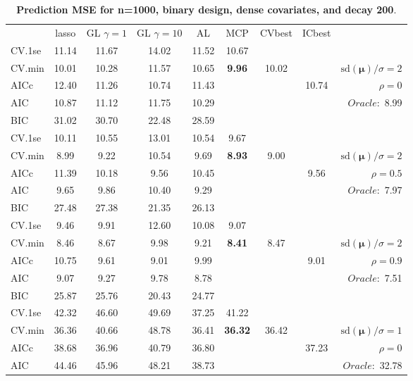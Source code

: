\clearpage
\begin{table}\vspace{-.5cm}
\caption[l]{ { \bf Prediction MSE for n=1000, binary design, 
dense covariates, and  decay  200}.}
\vspace{-.5cm}
\footnotesize{}
\begin{center}
\begin{tabular}{l*{7}{c}|r}
 & lasso & GL $\gamma=1$ & GL $\gamma=10$ & AL & MCP  & CVbest & ICbest  \\
\cline{1-9}
CV.1se & 11.14 & 11.67 & 14.02 & 11.52 & 10.67 & & & \\
CV.min & 10.01 & 10.28 & 11.57 & 10.65 & {\bf 9.96} & 10.02 & & $\mathrm{sd}(\mathbf{\mu})/\sigma=2$ \\
AICc & 12.40 & 11.26 & 10.74 & 11.43 & & & 10.74 &  $\rho=0$ \\
AIC & 10.87 & 11.12 & 11.75 & 10.29 & & & &  \multirow{2}{*}{$Oracle: $ 8.99} \\
BIC & 31.02 & 30.70 & 22.48 & 28.59 & & & &  \\
 \hline 
CV.1se & 10.11 & 10.55 & 13.01 & 10.54 & 9.67 & & & \\
CV.min & 8.99 & 9.22 & 10.54 & 9.69 & {\bf 8.93} & 9.00 & & $\mathrm{sd}(\mathbf{\mu})/\sigma=2$ \\
AICc & 11.39 & 10.18 & 9.56 & 10.45 & & & 9.56 &  $\rho=0.5$ \\
AIC & 9.65 & 9.86 & 10.40 & 9.29 & & & &  \multirow{2}{*}{$Oracle: $ 7.97} \\
BIC & 27.48 & 27.38 & 21.35 & 26.13 & & & &  \\
 \hline 
CV.1se & 9.46 & 9.91 & 12.60 & 10.08 & 9.07 & & & \\
CV.min & 8.46 & 8.67 & 9.98 & 9.21 & {\bf 8.41} & 8.47 & & $\mathrm{sd}(\mathbf{\mu})/\sigma=2$ \\
AICc & 10.75 & 9.61 & 9.01 & 9.99 & & & 9.01 &  $\rho=0.9$ \\
AIC & 9.07 & 9.27 & 9.78 & 8.78 & & & &  \multirow{2}{*}{$Oracle: $ 7.51} \\
BIC & 25.87 & 25.76 & 20.43 & 24.77 & & & &  \\
 \hline 
CV.1se & 42.32 & 46.60 & 49.69 & 37.25 & 41.22 & & & \\
CV.min & 36.36 & 40.66 & 48.78 & 36.41 & {\bf 36.32} & 36.42 & & $\mathrm{sd}(\mathbf{\mu})/\sigma=1$ \\
AICc & 38.68 & 36.96 & 40.79 & 36.80 & & & 37.23 &  $\rho=0$ \\
AIC & 44.46 & 45.96 & 48.21 & 38.73 & & & &  \multirow{2}{*}{$Oracle: $ 32.78} \\

\end{tabular}
\end{center}
\end{table}
